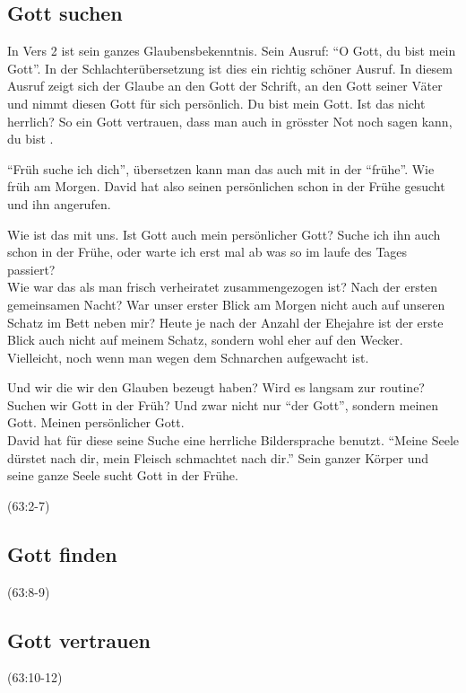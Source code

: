 \documentclass[14pt]{../../inc/mybib}
\begin{document}
    \subsection{Gott suchen}
    \begin{block}
    In Vers 2 ist sein ganzes Glaubensbekenntnis. Sein Ausruf: \enquote{O Gott, du bist mein Gott}. In der Schlachterübersetzung ist dies ein richtig schöner Ausruf. In diesem Ausruf zeigt sich der Glaube an den Gott der Schrift, an den Gott seiner Väter und nimmt diesen Gott für sich persönlich. Du bist mein Gott. Ist das nicht herrlich? So ein Gott vertrauen, dass man auch in grösster Not noch sagen kann, du bist . 

    \enquote{Früh suche ich dich}, übersetzen kann man das auch mit in der \enquote{frühe}. Wie früh am Morgen. David hat also seinen persönlichen schon in der Frühe gesucht und ihn angerufen.
    \end{block}
    \begin{block}
        Wie ist das mit uns. Ist Gott auch mein persönlicher Gott? Suche ich ihn auch schon in der Frühe, oder warte ich erst mal ab was so im laufe des Tages passiert?\\
        Wie war das als man frisch verheiratet zusammengezogen ist? Nach der ersten gemeinsamen Nacht? War unser erster Blick am Morgen nicht auch auf unseren Schatz im Bett neben mir? Heute je nach der Anzahl der Ehejahre ist der erste Blick auch nicht auf meinem Schatz, sondern wohl eher auf den Wecker. Vielleicht, noch wenn man wegen dem Schnarchen aufgewacht ist.

        Und wir die wir den Glauben bezeugt haben? Wird es langsam zur routine? Suchen wir Gott in der Früh? Und zwar nicht nur \enquote{der Gott}, sondern meinen Gott. Meinen persönlicher Gott.\\

        David hat für diese seine Suche eine herrliche Bildersprache benutzt. \enquote{Meine Seele dürstet nach dir, mein Fleisch schmachtet nach dir.} Sein ganzer Körper und seine ganze Seele sucht Gott in der Frühe.

    \end{block}
    (63:2-7)
    \subsection{Gott finden}
    (63:8-9)
    \subsection{Gott vertrauen}
    (63:10-12)

   
\end{document}
